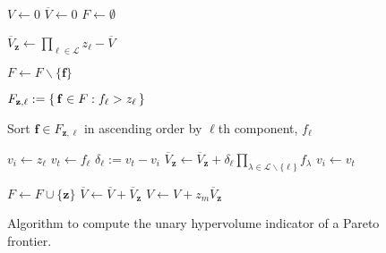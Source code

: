 \begin{figure}[!ht]
\caption[Algorithm to compute the unary hypervolume indicator of a Pareto frontier]{Algorithm to compute the unary hypervolume indicator of a Pareto frontier.}
\begin{algorithmic}[1]

\State $V \gets 0$
\State $\overbar{V} \gets 0$
\State $F \gets \emptyset$


	\State $\overbar{V}_\mathbf{z} \gets \prod_{\ell \in \mathcal{L}} z_\ell - \overbar{V}$
		
			\State $F \gets F \backslash \{\mathbf{f}\}$
		\EndIf
	\EndFor
	
	
		\State $F_{\mathbf{z},\ell} := \set{\mathbf{f} \in F : f_\ell > z_\ell}$
		
		\State Sort $\mathbf{f} \in F_{\mathbf{z},\ell}$ in ascending order by $\ell$th component, $f_\ell$
		
		\State $v_i \gets z_\ell$
			\State $v_t \gets f_\ell$
			\State $\delta_\ell := v_t - v_i$
			\State $\overbar{V}_\mathbf{z} \gets \overbar{V}_\mathbf{z} + \delta_\ell \prod_{\lambda \in \mathcal{L} \backslash \{\ell\}} f_\lambda$
			\State $v_i \gets v_t$
		\EndFor
		
	\EndFor
	
	\State $F \gets F \cup \{\mathbf{z}\}$
	\State $\overbar{V} \gets \overbar{V} + \overbar{V}_\mathbf{z}$
	\State $V \gets V + z_m \overbar{V}_\mathbf{z}$
\EndFor


\end{algorithmic}
\end{figure}